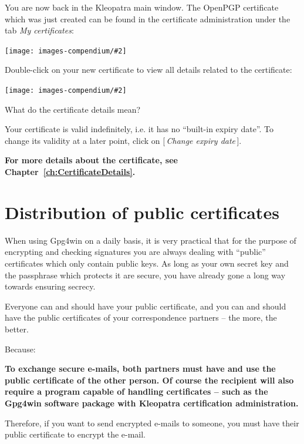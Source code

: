 \documentclass[a4paper,11pt,oneside,openright,titlepage]{scrbook}
\newcommand{\Button}[1]{[\,\textit{#1}\,]}
\newcommand{\Menu}[1]{\textit{#1}}
\newcommand{\Email}{e-mail}
\newcommand{\IncludeImage}[2][]{
\begin{center}
  \texttt{[image: images-compendium/\#2]}%
\end{center}
}
\begin{document}

You are now back in the Kleopatra main window. The OpenPGP certificate
which was just created can be found in the certificate administration
under the tab \Menu{My certificates}:


\IncludeImage[width=0.85\textwidth]{sc-kleopatra-withOpenpgpTestkey_en}

\clearpage
Double-click on your new certificate to view all details related to
the certificate:


\IncludeImage[width=0.85\textwidth]{sc-kleopatra-openpgp-certificateDetails_en}

What do the certificate details mean?

Your certificate is valid indefinitely, i.e. it has no ``built-in
expiry date''. To change its validity at a later point, click
on \Button{Change expiry date}.

\textbf{For more details about the certificate, see
Chapter~\ref{ch:CertificateDetails}.}


\clearpage
\chapter{Distribution of public certificates}
\label{ch:publishCertificate}

When using Gpg4win on a daily basis, it is very practical that for the
purpose of encrypting and checking signatures you are always dealing
with ``public'' certificates which only contain public keys. As long
as your own secret key and the passphrase which protects it are
secure, you have already gone a long way towards ensuring secrecy.

Everyone can and should have your public certificate, and you can and
should have the public certificates of your correspondence partners --
the more, the better.

Because:

\textbf{To exchange secure \Email{}s, both partners must have and
use the public certificate of the other person. Of course the
recipient will also require a program capable of handling certificates
-- such as the Gpg4win software package with Kleopatra certification
administration.}

Therefore, if you want to send encrypted \Email{}s to someone,
you must have their public certificate to encrypt the \Email{}.
\end{document}
